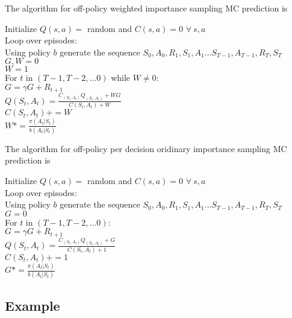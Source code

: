 \documentclass[11pt,a4paper]{article}
\begin{document}
The algorithm for off-policy weighted importance sampling MC prediction is

\begin{tcolorbox}[enhanced,title=Off-policy weighted importance sampling prediction]
Initialize $Q(s,a)=$ random and $C(s,a)=0$ $\forall~s,a$ \\
Loop over episodes: \\
 \phantom{abcd} Using policy $b$ generate the sequence  $S_0,A_0, R_1,S_1,A_1 \dots S_{T-1}, A_{T-1},R_T,S_T$ \\
 \phantom{abcd} $G,W=0$ \\
  \phantom{abcd} $W=1$ \\
  \phantom{abcd} For $t$ in $(T-1,T-2,\dots 0)$ while $W \ne 0$: \\
  \phantom{abcd}   \phantom{abcd}  $G = \gamma G + R_{t+1}$ \\
  \phantom{abcd}   \phantom{abcd}  $Q(S_t,A_t) = \frac{C_(S_t,A_t) Q_(S_t,A_t) +W G}{C(S_t,A_t)+W}$ \\
    \phantom{abcd}   \phantom{abcd}  $C(S_t,A_t) += W$ \\
    \phantom{abcd}   \phantom{abcd}  $W*= \frac{\pi(A_t|S_t)}{b(A_t|S_t)}$   
\end{tcolorbox}
The algorithm for off-policy per decision oridinary importance sampling MC prediction is

\begin{tcolorbox}[enhanced,title=Off-policy per decision ordinary importance sampling prediction]
Initialize $Q(s,a)=$ random and $C(s,a)=0$ $\forall~s,a$ \\
Loop over episodes: \\
 \phantom{abcd} Using policy $b$ generate the sequence  $S_0,A_0, R_1,S_1,A_1 \dots S_{T-1}, A_{T-1},R_T,S_T$ \\
 \phantom{abcd} $G=0$ \\
  \phantom{abcd} For $t$ in $(T-1,T-2,\dots 0)$: \\
  \phantom{abcd}   \phantom{abcd}  $G = \gamma G + R_{t+1}$ \\
  \phantom{abcd}   \phantom{abcd}  $Q(S_t,A_t) = \frac{C_(S_t,A_t) Q_(S_t,A_t) + G}{C(S_t,A_t)+1}$ \\
    \phantom{abcd}   \phantom{abcd}  $C(S_t,A_t) += 1$ \\
    \phantom{abcd}   \phantom{abcd}  $G*= \frac{\pi(A_t|S_t)}{b(A_t|S_t)}$   
\end{tcolorbox}

\subsection{Example}
\end{document}
